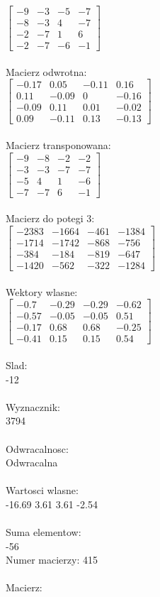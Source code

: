 \documentclass[a4paper,12pt]{article}
\begin{document}
$\begin{bmatrix} -9&-3&-5&-7\\-8&-3&4&-7\\-2&-7&1&6\\-2&-7&-6&-1 \end{bmatrix}$
\\
\\
Macierz odwrotna:\\

$\begin{bmatrix} -0.17&0.05&-0.11&0.16\\0.11&-0.09&0&-0.16\\-0.09&0.11&0.01&-0.02\\0.09&-0.11&0.13&-0.13 \end{bmatrix}$
\\
\\
Macierz transponowana:\\

$\begin{bmatrix} -9&-8&-2&-2\\-3&-3&-7&-7\\-5&4&1&-6\\-7&-7&6&-1 \end{bmatrix}$
\\
\\
Macierz do potegi 3:\\

$\begin{bmatrix} -2383&-1664&-461&-1384\\-1714&-1742&-868&-756\\-384&-184&-819&-647\\-1420&-562&-322&-1284 \end{bmatrix}$
\\
\\
Wektory wlasne:\\

$\begin{bmatrix} -0.7&-0.29&-0.29&-0.62\\-0.57&-0.05&-0.05&0.51\\-0.17&0.68&0.68&-0.25\\-0.41&0.15&0.15&0.54 \end{bmatrix}$
\\
\\
Slad:\\
-12
\\
\\
Wyznacznik:\\
3794
\\
\\
Odwracalnosc:\\
Odwracalna
\\
\\
Wartosci wlasne:\\
-16.69 3.61 3.61 -2.54
\\
\\
Suma elementow:\\
-56
\\
\newpage
Numer macierzy:
415
\\
\\
Macierz:\\
\end{document}
